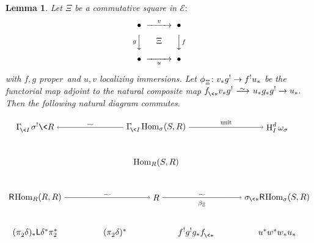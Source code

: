 \documentclass{compositio}
\theoremstyle{plain}
\newtheorem{sublem}[equation]{Lemma}
\theoremstyle{definition}
\theoremstyle{remark}
\numberwithin{equation}{thm}
\begin{document}
\begin{sublem} 
\label{compat}
Let\/ $\Xi$ be a commutative square  in ${\mathscr{E}}\colon$
$$
\CD
\bullet @>v>> \bullet  \\
@V g VV @VV f V \\
\bullet@>{\vbox to 0pt{\vss\hbox{$\Xi$}\vskip.21in}} > {\vbox to 0pt{\vskip-1.2 ex\hbox{$\scriptstyle u$}\vss}} >\bullet
\endCD
$$
with $f,g$ proper\ and $ u,v$ localizing immersions. Let\/ $\phi^{}_{{\mkern1mu}\Xi}\colon v_*g^!\to f^!u_*$ be the
functorial map adjoint to the natural composite map\/
\mbox{${{f^{}_{{\mkern-1mu}\<*}}} v_*g^!{\mkern-1mu}{\mkern-1mu}{{\mkern8mu\longrightarrow \mkern-25.5mu{}^\sim\mkern17mu}}{\mkern-1mu}{\mkern-1mu} u_*g_*g^!\to u_*.$}
Then the following natural diagram commutes.

\[

 \begin{tikzpicture}[xscale=5, yscale=1.45]

   \node(11) at (1,-1){$\Gamma^{}_{\!{\mkern-1mu}\<I}{\mkern1mu}{\mkern1mu}\sigma^!\<R$};
   \node(12) at (2,-1){$\Gamma^{}_{\!{\mkern-1mu}\<I}{\mkern-1mu}\operatorname{Hom}_\sigma(S,R)$};   
   \node(13) at (3,-1){$\textup{H}^d_I\,\omega_\sigma$};
    
   \node(22) at (2,-2){$\operatorname{Hom}_R(S,R)$};
   
   \node(32) at (2,-3){$R$};
   
   \node(41) at (1,-3){${\mathsf R}{\mkern-1mu}{\mkern-1mu}\operatorname{Hom}_R(R,R)$};
   \node(43) at (3,-3){$\sigma_{{\mkern-1mu}\<*}{\mathsf R}{\mkern-1mu}{\mkern-1mu}\operatorname{Hom}_\sigma(S,R)$};

   \node(51) at (1,-4){$(\pi^{}_2\delta)_*{\mathsf L}\delta^*\pi_2^*$};
   \node(52) at (1.66,-4){$(\pi^{}_2\delta)^*$};
   \node(53) at (2.33,-4){$f^!g^!g_*{{f^{}_{{\mkern-1mu}\<*}}}$};
   \node(54) at (3,-4){$u^*w^*w_*u_*$};
   
  
   \draw[<-] (11)--(12) node[above=1pt, midway, scale=.75]{${\vbox to 0pt{\vss\hbox{$\widetilde{\phantom{nn}}$}\vskip-7pt}}$};
   \draw[->] (12)--(13) node[above=1pt, midway, scale=.75]{\textup{unit}};

  \draw[->] (41)--(32) node[above=1pt, midway, scale=.75]{${\vbox to 0pt{\vss\hbox{$\widetilde{\phantom{nn}}$}\vskip-7pt}}$};
  \draw[->] (32)--(43)  node[above=1pt, midway, scale=.75]{${\vbox to 0pt{\vss\hbox{$\widetilde{\phantom{nn}}$}\vskip-7pt}}$}
                                  node[below=1pt, midway, scale=.75]{$\beta_{{\mkern1mu}\Xi}$};
     

\end{tikzpicture}\]
\end{sublem}
\end{document}
